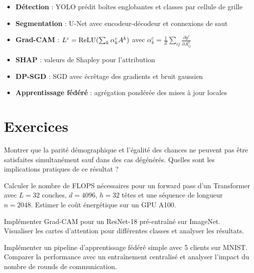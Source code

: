 \begin{formules}
\begin{itemize}
\item \textbf{D\'etection} : YOLO pr\'edit bo\^ites englobantes et classes par cellule de grille
\item \textbf{Segmentation} : U-Net avec encodeur-d\'ecodeur et connexions de saut
\item \textbf{Grad-CAM} : $L^c = \mathrm{ReLU}(\sum_k \alpha_k^c A^k)$ avec $\alpha_k^c = \frac{1}{Z}\sum_{ij}\frac{\partial y^c}{\partial A^k_{ij}}$
\item \textbf{SHAP} : valeurs de Shapley pour l'attribution
\item \textbf{DP-SGD} : SGD avec \'ecr\^etage des gradients et bruit gaussien
\item \textbf{Apprentissage f\'ed\'er\'e} : agr\'egation pond\'er\'ee des mises \`a jour locales
\end{itemize}
\end{formules}

\section{Exercices}

\begin{exercice}
Montrer que la parit\'e d\'emographique et l'\'egalit\'e des chances ne peuvent pas \^etre satisfaites simultan\'ement sauf dans des cas d\'eg\'en\'er\'es. Quelles sont les implications pratiques de ce r\'esultat ?
\end{exercice}

\begin{exercice}
Calculer le nombre de FLOPS n\'ecessaires pour un forward pass d'un Transformer avec $L=32$ couches, $d=4096$, $h=32$ t\^etes et une s\'equence de longueur $n=2048$. Estimer le co\^ut \'energ\'etique sur un GPU A100.
\end{exercice}

\begin{exercice}
Impl\'ementer Grad-CAM pour un ResNet-18 pr\'e-entra\^in\'e sur ImageNet. Visualiser les cartes d'attention pour diff\'erentes classes et analyser les r\'esultats.
\end{exercice}

\begin{exercice}
Impl\'ementer un pipeline d'apprentissage f\'ed\'er\'e simple avec 5 clients sur MNIST. Comparer la performance avec un entra\^inement centralis\'e et analyser l'impact du nombre de rounds de communication.
\end{exercice}

